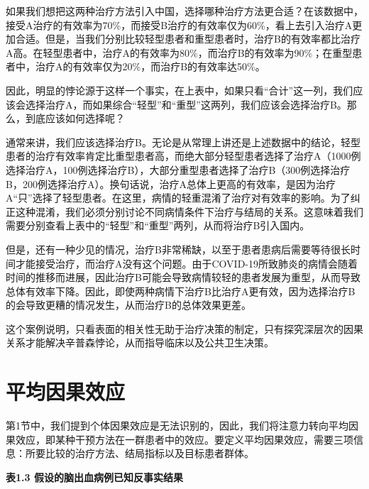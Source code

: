 \documentclass[
  chinese-hans,
  letterpaper,
  DIV=11,
  numbers=noendperiod]{scrreprt}
\begin{document}
如果我们想把这两种治疗方法引入中国，选择哪种治疗方法更合适？在该数据中，接受A治疗的有效率为70\%，而接受B治疗的有效率仅为60\%，看上去引入治疗A更加合适。但是，当我们分别比较轻型患者和重型患者时，治疗B的有效率都比治疗A高。在轻型患者中，治疗A的有效率为80\%，而治疗B的有效率为90\%；在重型患者中，治疗A的有效率仅为20\%，而治疗B的有效率达50\%。

因此，明显的悖论源于这样一个事实，在上表中，如果只看``合计''这一列，我们应该会选择治疗A，而如果综合``轻型''和``重型''这两列，我们应该会选择治疗B。那么，到底应该如何选择呢？

通常来讲，我们应该选择治疗B。无论是从常理上讲还是上述数据中的结论，轻型患者的治疗有效率肯定比重型患者高，而绝大部分轻型患者选择了治疗A（1000例选择治疗A，100例选择治疗B），大部分重型患者选择了治疗B（300例选择治疗B，200例选择治疗A）。换句话说，治疗A总体上更高的有效率，是因为治疗A``只''选择了轻型患者。在这里，病情的轻重混淆了治疗对有效率的影响。为了纠正这种混淆，我们必须分别讨论不同病情条件下治疗与结局的关系。这意味着我们需要分别查看上表中的``轻型''和``重型''两列，从而将治疗B引入国内。

但是，还有一种少见的情况，治疗B非常稀缺，以至于患者患病后需要等待很长时间才能接受治疗，而治疗A没有这个问题。由于COVID-19所致肺炎的病情会随着时间的推移而进展，因此治疗B可能会导致病情较轻的患者发展为重型，从而导致总体有效率下降。因此，即使两种病情下治疗B比治疗A更有效，因为选择治疗B的会导致更糟的情况发生，从而治疗B的总体效果更差。

这个案例说明，只看表面的相关性无助于治疗决策的制定，只有探究深层次的因果关系才能解决辛普森悖论，从而指导临床以及公共卫生决策。

\section{平均因果效应}\label{ux5e73ux5747ux56e0ux679cux6548ux5e94}

第1节中，我们提到个体因果效应是无法识别的，因此，我们将注意力转向平均因果效应，即某种干预方法在一群患者中的效应。要定义平均因果效应，需要三项信息：所要比较的治疗方法、结局指标以及目标患者群体。

\textbf{表1.3 假设的脑出血病例已知反事实结果}
\end{document}
